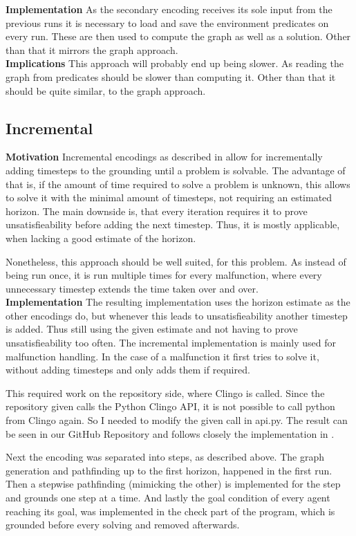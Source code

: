 \noindent \textbf{Implementation} As the secondary encoding receives its sole input from the previous runs it is necessary to load and save the environment predicates on every run. These are then used to compute the graph as well as a solution. Other than that it mirrors the graph approach.\\

\noindent \textbf{Implications} This approach will probably end up being slower. As reading the graph from predicates should be slower than computing it. Other than that it should be quite similar, to the graph approach.

\subsection{Incremental}
\textbf{Motivation} Incremental encodings as described in \cite{incr} allow for incrementally adding timesteps to the grounding until a problem is solvable. The advantage of that is, if the amount of time required to solve a problem is unknown, this allows to solve it with the minimal amount of timesteps, not requiring an estimated horizon. The main downside is, that every iteration requires it to prove unsatisfieability before adding the next timestep. Thus, it is mostly applicable, when lacking a good estimate of the horizon.

Nonetheless, this approach should be well suited, for this problem. As instead of being run once, it is run multiple times for every malfunction, where every unnecessary timestep extends the time taken over and over. \\

\noindent \textbf{Implementation} The resulting implementation uses the horizon estimate as the other encodings do, but whenever this leads to unsatisfieability another timestep is added. Thus still using the given estimate and not having to prove unsatisfieability too often. The incremental implementation is mainly used for malfunction handling. In the case of a malfunction it first tries to solve it, without adding timesteps and only adds them if required.

This required work on the repository side, where Clingo is called. Since the repository given calls the Python Clingo API, it is not possible to call python from Clingo again. So I needed to modify the given call in api.py. The result can be seen in our GitHub Repository and follows closely the implementation in \cite{incr}.

Next the encoding was separated into steps, as described above. The graph generation and pathfinding up to the first horizon, happened in the first run. Then a stepwise pathfinding (mimicking the other) is implemented for the step and grounds one step at a time. And lastly the goal condition of every agent reaching its goal, was implemented in the check part of the program, which is grounded before every solving and removed afterwards.

